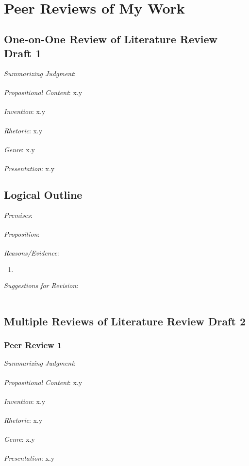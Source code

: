 \documentclass[12pt]{article}
\begin{document}
\newpage

\section{Peer Reviews of My Work}
\subsection{One-on-One Review of Literature Review Draft 1}
\noindent \textit{Summarizing Judgment}: \\ \\
\textit{Propositional Content}: x.y \\ \\ %
\textit{Invention}: x.y \\ \\
\textit{Rhetoric}: x.y \\ \\
\textit{Genre}: x.y \\ \\
\textit{Presentation}: x.y
\subsection*{Logical Outline}
\noindent \textit{Premises}: \\ \\
\textit{Proposition}: \\ \\
\textit{Reasons/Evidence}:
\begin{enumerate}
	\item \ %
\end{enumerate}
\textit{Suggestions for Revision}: \\\\




\newpage
\subsection{Multiple Reviews of Literature Review Draft 2}
\subsubsection*{Peer Review 1} 
\noindent \textit{Summarizing Judgment}: \\ \\
\textit{Propositional Content}: x.y \\ \\ %
\textit{Invention}: x.y \\ \\
\textit{Rhetoric}: x.y \\ \\
\textit{Genre}: x.y \\ \\
\textit{Presentation}: x.y
\end{document}
